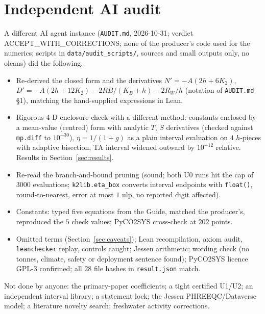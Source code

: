 \documentclass[10pt]{article}
\begin{document}
\section{Independent AI audit}\label{sec:audit}
A different AI agent instance (\texttt{AUDIT.md}, 2026-10-31; verdict ACCEPT\_WITH\_CORRECTIONS; none of the producer's code used for the numerics; scripts in \texttt{data/audit\_scripts/}, sources and small outputs only, no oleans) did the following.
\begin{itemize}\itemsep=1pt
\item Re-derived the closed form and the derivatives $N'=-A(2h+6K_2)$, $D'=-A(2h+12K_2)-2RB/(K_B+h)-2R_W/h$ (notation of \texttt{AUDIT.md} \S1), matching the hand-supplied expressions in Lean.
\item Rigorous 4-D enclosure check with a different method: constants enclosed by a mean-value (centred) form with analytic $T$, $S$ derivatives (checked against \texttt{mp.diff} to $10^{-30}$), $\eta=1/(1+g)$ as a plain interval evaluation on $4$ $h$-pieces with adaptive bisection, TA interval widened outward by $10^{-12}$ relative. Results in Section~\ref{sec:results}.
\item Re-read the branch-and-bound pruning (sound; both U0 runs hit the cap of $3000$ evaluations; \texttt{k2lib.eta\_box} converts interval endpoints with \texttt{float()}, round-to-nearest, error at most $1$ ulp, no reported digit affected).
\item Constants: typed five equations from the Guide, matched the producer's, reproduced the $5$ check values; PyCO2SYS cross-check at $202$ points.
\item Omitted terms (Section~\ref{sec:caveats}); Lean recompilation, axiom audit, \texttt{leanchecker} replay, controls caught; Jessen arithmetic; wording check (no tonnes, climate, safety or deployment sentence found); PyCO2SYS licence GPL-3 confirmed; all $28$ file hashes in \texttt{result.json} match.
\end{itemize}
Not done by anyone: the primary-paper coefficients; a tight certified U1/U2; an independent interval library; a statement lock; the Jessen PHREEQC/Dataverse model; a literature novelty search; freshwater activity corrections.

\end{document}
